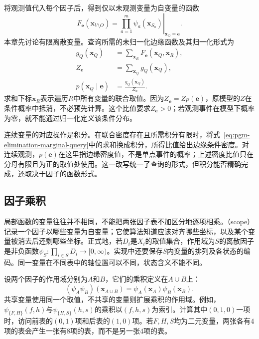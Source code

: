 将观测值代入每个因子后，得到仅以未观测变量为自变量的函数
\begin{equation}
  F_{\bm{e}}(\bm{x}_{V\setminus O})
  =\left.\prod_{a=1}^{m}\psi_a(\bm{x}_{S_a})
  \right|_{\bm{x}_O=\bm{e}}.
  \label{eq:pgm-elimination-evidence-function}
\end{equation}
本章先讨论有限离散变量。查询所需的未归一化边缘函数及其归一化形式为
\begin{equation}
  \begin{aligned}
    g_Q(\bm{x}_Q)
      &=\sum_{\bm{x}_R}F_{\bm{e}}(\bm{x}_Q,\bm{x}_R),\\
    Z_{\bm{e}}&=\sum_{\bm{x}_Q}g_Q(\bm{x}_Q),\\
    p(\bm{x}_Q\mid\bm{e})&=\frac{g_Q(\bm{x}_Q)}{Z_{\bm{e}}}.
  \end{aligned}
  \label{eq:pgm-elimination-marginal-query}
\end{equation}
求和下标$\bm{x}_R$表示遍历$R$中所有变量的联合取值。因为$Z_{\bm{e}}=Zp(\bm{e})$，原模型的$Z$在条件概率中抵消，不必预先计算。这个比值要求$Z_{\bm{e}}>0$；若观测事件在模型下概率为零，就不能通过归一化定义该条件分布。

连续变量的对应操作是积分。在联合密度存在且所需积分有限时，将式~\eqref{eq:pgm-elimination-marginal-query}中的求和换成积分，所得比值给出边缘条件密度。对连续观测，$p(\bm{e})$在这里指边缘密度值，不是单点事件的概率；上述密度比值只在分母有限且为正的取值处使用。这一改写统一了查询的形式，但积分能否精确完成，还取决于因子的函数形式。

\subsection{因子乘积}
\label{sec:pgm-elimination-factor-product}

局部函数的变量往往并不相同，不能把两张因子表不加区分地逐项相乘。（scope）记录一个因子以哪些变量为自变量；它使算法知道应该对齐哪些坐标，以及某个变量被消去后还剩哪些坐标。正式地，若$D_i$是$X_i$的取值集合，作用域为$S$的离散因子是非负函数$\psi_S:\prod_{i\in S}D_i\to[0,\infty)$。实现中还要保存$S$内变量的排列及各状态的编码。同一变量在不同表中的轴位置可以不同，状态含义不能不同。

设两个因子的作用域分别为$A$和$B$，它们的乘积定义在$A\cup B$上：
\begin{equation}
  (\psi_A\psi_B)(\bm{x}_{A\cup B})
  =\psi_A(\bm{x}_A)\psi_B(\bm{x}_B).
  \label{eq:pgm-elimination-product}
\end{equation}
共享变量使用同一个取值，不共享的变量则扩展乘积的作用域。例如，$\psi_{\{F,H\}}(f,h)$与$\psi_{\{H,S\}}(h,s)$的乘积以$(f,h,s)$为索引。计算其中$(0,1,0)$一项时，访问前表的$(0,1)$项和后表的$(1,0)$项。若$F,H,S$均为二元变量，两张各有$4$项的表会产生一张有$8$项的表，而不是另一张$4$项的表。

